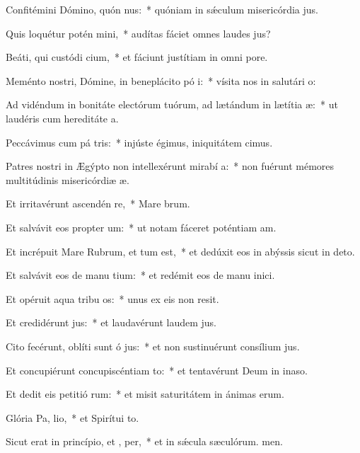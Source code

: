 \item Confitémini Dómino, quón nus:~* quóniam in sǽculum misericórdia jus.
\item Quis loquétur potén mini,~* audítas fáciet omnes laudes jus?
\item Beáti, qui custódi cium,~* et fáciunt justítiam in omni pore.
\item Meménto nostri, Dómine, in beneplácito pó i:~* vísita nos in salutári o:
\item Ad vidéndum in bonitáte electórum tuórum, ad lætándum in lætítia  æ:~* ut laudéris cum hereditáte a.
\item Peccávimus cum pá tris:~* injúste égimus, iniquitátem cimus.
\item Patres nostri in Ægýpto non intellexérunt mirabí a:~* non fuérunt mémores multitúdinis misericórdiæ æ.
\item Et irritavérunt ascendén  re,~* Mare brum.
\item Et salvávit eos propter  um:~* ut notam fáceret poténtiam am.
\item Et incrépuit Mare Rubrum, et tum est,~* et dedúxit eos in abýssis sicut in deto.
\item Et salvávit eos de manu tium:~* et redémit eos de manu inici.
\item Et opéruit aqua tribu os:~* unus ex eis non resit.
\item Et credidérunt  jus:~* et laudavérunt laudem jus.
\item Cito fecérunt, oblíti sunt ó jus:~* et non sustinuérunt consílium jus.
\item Et concupiérunt concupiscéntiam  to:~* et tentavérunt Deum in inaso.
\item Et dedit eis petitió rum:~* et misit saturitátem in ánimas erum.
\item Glória Pa,  lio,~* et Spirítui to.
\item Sicut erat in princípio, et ,  per,~* et in sǽcula sæculórum. men.
